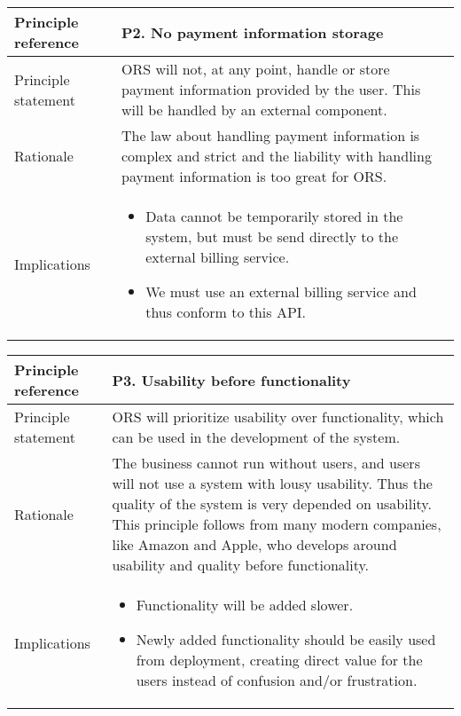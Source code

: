 \begin{center}
  \begin{tabular}[h!]{| >{\columncolor{gray}}p{} | p{} |}
    \hline
    Principle reference & P2. No payment information storage\\
    \hline
    Principle statement & ORS will not, at any point, handle or store payment information provided by the user. This will be handled by an external component.\\
    \hline
    Rationale & The law about handling payment information is complex and strict and the liability with handling payment information is too great for ORS.\\
    \hline
    Implications &
      \begin{itemize}
        \item Data cannot be temporarily stored in the system, but must be send directly to the external billing service.
        \item We must use an external billing service and thus conform to this API.
      \end{itemize}\\
    \hline
  \end{tabular}
\end{center}

\begin{center}
  \begin{tabular}[h!]{| >{\columncolor{gray}}p{} | p{} |}
    \hline
    Principle reference & P3. Usability before functionality\\
    \hline
    Principle statement & ORS will prioritize usability over functionality, which can be used in the development of the system.\\
    \hline
    Rationale & The business cannot run without users, and users will not use a system with lousy usability. Thus the quality of the system is very depended on usability. This principle follows from many modern companies, like Amazon and Apple, who develops around usability and quality before functionality. \\
    \hline
    Implications &
      \begin{itemize}
        \item Functionality will be added slower.
        \item Newly added functionality should be easily used from deployment, creating direct value for the users instead of confusion and/or frustration.
      \end{itemize}\\
    \hline
  \end{tabular}
\end{center}


